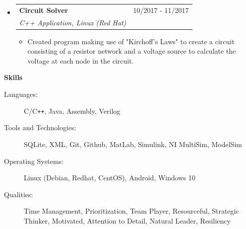 \documentclass[letterpaper,11pt]{article}
\makeatletter
\newcommand{\resitem}[1]{\item #1 \vspace{-2pt}}
\newcommand{\resheading}[1]{{\large \colorbox{mygrey}{\begin{minipage}{\textwidth}{\textbf{#1 \vphantom{p\^{E}}}}\end{minipage}}}}
\newcommand{\ressubheading}[4]{
\begin{tabular*}{7.0in}{l@{\extracolsep{\fill}}r}
		\textbf{#1} & #2 \\
		\textit{#3} & \textit{#4} \\
\end{tabular*}\vspace{-6pt}}
\makeatother
\begin{document}
\begin{itemize}
  	\item
      \ressubheading{Circuit Solver}{10/2017 -   11/2017}{C++ Application, Linux (Red Hat)}{}
      \begin{itemize}
          \resitem{Created program making use of "Kirchoff's Laws" to create a circuit consisting of a resistor network and a voltage source to calculate the voltage at each node in the circuit.}
      \end{itemize}
    

\end{itemize}


\resheading{Skills}

\begin{description}
\item[Languages:]
C/C{}\verb!++!, Java, Assembly, Verilog
\item[Tools and Technologies:]
SQLite, XML, Git, Github, MatLab, Simulink, NI MultiSim, ModelSim
\item[Operating Systems:]
Linux (Debian, Redhat, CentOS), Android, Windows 10
\item[Qualities:]
Time Management, Prioritization, Team Player, Resourceful, Strategic Thinker, Motivated, Attention to Detail, Natural Leader, Resiliency
\end{description}


\pagebreak
\end{document}
